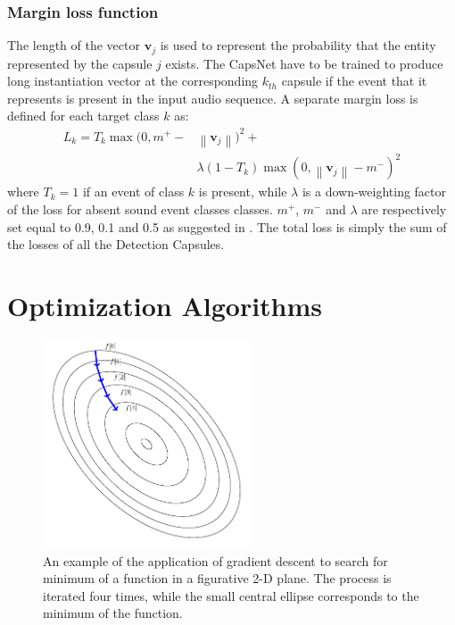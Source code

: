 \subsubsection{Margin loss function}
The length of the vector $\mathbf{v}_j$ is used to represent the probability that the entity represented by the capsule $j$
exists.
The CapsNet have to be trained to produce long instantiation vector at the corresponding $k_{th}$ capsule if the event that it represents is present in the input audio sequence.
A separate margin loss is defined for each target class $k$ as:
\begin{equation}
\begin{split}
L_k = T_k \max(0, m^+ - & \left \|\mathbf{v}_j \right \|)^2 + \\
&\lambda(1 - T_k)\max(0, \left \|\mathbf{v}_j \right \| - m^-)^2
\end{split}
\end{equation}
where $T_k = 1$ if an event of class $k$ is present, while $\lambda$ is a down-weighting factor of the loss for absent sound event classes classes. 
$m^+$, $ m^-$ and $\lambda$ are respectively set equal to 0.9, 0.1 and 0.5 as suggested in \cite{sabour2017dynamic}.
The total loss is simply the sum of the losses of all the Detection Capsules.



\section{Optimization Algorithms}

\begin{figure}[h]
	\center
	\includegraphics[width=0.550\textwidth]{img/gradient_descent}
	\caption[Example of Gradient Descent]{An example of the application of gradient descent to search for minimum of a function in a figurative 2-D plane. The process is iterated four times, while the small central ellipse corresponds to the minimum of the function.}
	\label{fig:gradient_descent}
\end{figure}

